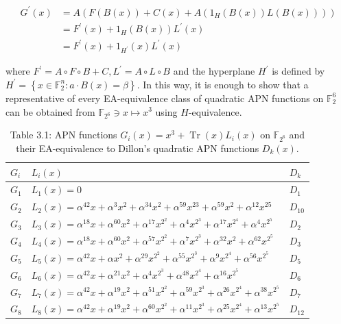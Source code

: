 \documentclass[10pt]{article}
\begin{document}
$$
\begin{aligned}
G^{\prime}(x) & =A\left(F(B(x))+C(x)+A\left(1_{H}(B(x)) L(B(x))\right)\right) \\
& =F^{\prime}(x)+1_{H}(B(x)) L^{\prime}(x) \\
& =F^{\prime}(x)+1_{H^{\prime}}(x) L^{\prime}(x)
\end{aligned}
$$

where $F^{\prime}=A \circ F \circ B+C, L^{\prime}=A \circ L \circ B$ and the hyperplane $H^{\prime}$ is defined by $H^{\prime}=\left\{x \in \mathbb{F}_{2}^{n}: a \cdot B(x)=\beta\right\}$. In this way, it is enough to show that a representative of every EA-equivalence class of quadratic APN functions on $\mathbb{F}_{2}^{6}$ can be obtained from $\mathbb{F}_{2^{6}} \ni x \mapsto x^{3}$ using $H$-equivalence.

\begin{table}[h]
\begin{center}
\captionsetup{labelformat=empty}
\caption{Table 3.1: APN functions $G_{i}(x)=x^{3}+\operatorname{Tr}(x) L_{i}(x)$ on $\mathbb{F}_{2^{6}}$ and their EA-equivalence to Dillon's quadratic APN functions $D_{k}(x)$.}
\begin{tabular}{|l|l|l|}
\hline
$G_{i}$ & $L_{i}(x)$ & $D_{k}$ \\
\hline
$G_{1}$ & $L_{1}(x)=0$ & $D_{1}$ \\
\hline
$G_{2}$ & $L_{2}(x)=\alpha^{42} x+\alpha^{3} x^{2}+\alpha^{34} x^{2}+\alpha^{59} x^{23}+\alpha^{59} x^{2}+\alpha^{12} x^{25}$ & $D_{10}$ \\
\hline
$G_{3}$ & $L_{3}(x)=\alpha^{18} x+\alpha^{60} x^{2}+\alpha^{17} x^{2^{2}}+\alpha^{4} x^{2^{3}}+\alpha^{17} x^{2^{4}}+\alpha^{4} x^{2^{5}}$ & $D_{2}$ \\
\hline
$G_{4}$ & $L_{4}(x)=\alpha^{18} x+\alpha^{60} x^{2}+\alpha^{57} x^{2^{2}}+\alpha^{7} x^{2^{3}}+\alpha^{32} x^{2}+\alpha^{62} x^{2^{5}}$ & $D_{3}$ \\
\hline
$G_{5}$ & $L_{5}(x)=\alpha^{42} x+\alpha x^{2}+\alpha^{29} x^{2^{2}}+\alpha^{55} x^{2^{3}}+\alpha^{9} x^{2^{4}}+\alpha^{56} x^{2^{5}}$ & $D_{5}$ \\
\hline
$G_{6}$ & $L_{6}(x)=\alpha^{42} x+\alpha^{21} x^{2}+\alpha^{4} x^{2^{3}}+\alpha^{48} x^{2^{4}}+\alpha^{16} x^{2^{5}}$ & $D_{6}$ \\
\hline
$G_{7}$ & $L_{7}(x)=\alpha^{42} x+\alpha^{19} x^{2}+\alpha^{51} x^{2^{2}}+\alpha^{59} x^{2^{3}}+\alpha^{26} x^{2^{4}}+\alpha^{38} x^{2^{5}}$ & $D_{7}$ \\
\hline
$G_{8}$ & $L_{8}(x)=\alpha^{42} x+\alpha^{19} x^{2}+\alpha^{60} x^{2^{2}}+\alpha^{11} x^{2^{3}}+\alpha^{25} x^{2^{4}}+\alpha^{13} x^{2^{5}}$ & $D_{12}$ \\

\end{tabular}
\end{center}
\end{table}
\end{document}
